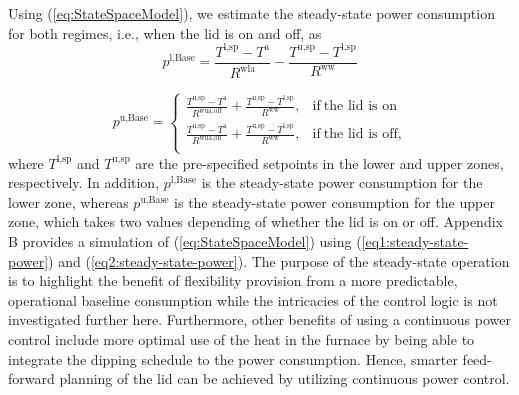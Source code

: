 \documentclass[conference]{IEEEtran}
\begin{document}
Using (\ref{eq:StateSpaceModel}), we  estimate the steady-state power consumption for both regimes, i.e., when the lid is on and off, as
%
%
\begin{equation}\label{eq1:steady-state-power}
    p^{\text{l},\text{Base}} = \frac{T^{\text{l},\text{sp}} - T^{\text{a}}}{R^{\text{wla}}} - \frac{T^{\text{u},\text{sp}}-T^{\text{l},\text{sp}}}{R^{\text{ww}}}
\end{equation}

\begin{equation}\label{eq2:steady-state-power}
    p^{\text{u},\text{Base}}   =
    \begin{cases}
        \frac{T^{\text{u},\text{sp}} - T^{\text{a}}}{R^{\text{wua},\text{off}}}  + \frac{T^{\text{u},\text{sp}}-T^{\text{l},\text{sp}}}{R^{\text{ww}}}, & \text{if} \ \text{the lid is on}   \\
        \frac{T^{\text{u},\text{sp}} - T^{\text{a}}}{R^{\text{wua},\text{on}}} + \frac{T^{\text{u},\text{sp}}-T^{\text{l},\text{sp}}}{R^{\text{ww}}},   & \text{if} \ \text{the lid is off,} \\
    \end{cases}
\end{equation}
where $T^{\text{l},\text{sp}}$ and $T^{\text{u},\text{sp}}$ are the pre-specified setpoints in the lower and upper zones, respectively. In addition, $p^{\text{l},\text{Base}}$ is the steady-state power consumption for the lower zone, whereas $p^{\text{u},\text{Base}}$ is the steady-state power consumption for the upper zone, which takes two values depending of whether the lid is on or off.
%
Appendix B provides a simulation of (\ref{eq:StateSpaceModel}) using (\ref{eq1:steady-state-power}) and (\ref{eq2:steady-state-power}). The purpose of the steady-state operation is to highlight the benefit of flexibility provision from a more predictable, operational baseline consumption while the intricacies of the control logic is not investigated further here.
%
Furthermore, other benefits of using a  continuous power control include more optimal use of the heat in the furnace by being able to integrate the dipping schedule to the power consumption. Hence, smarter feed-forward planning of the lid can be achieved by utilizing continuous power control.
\end{document}
